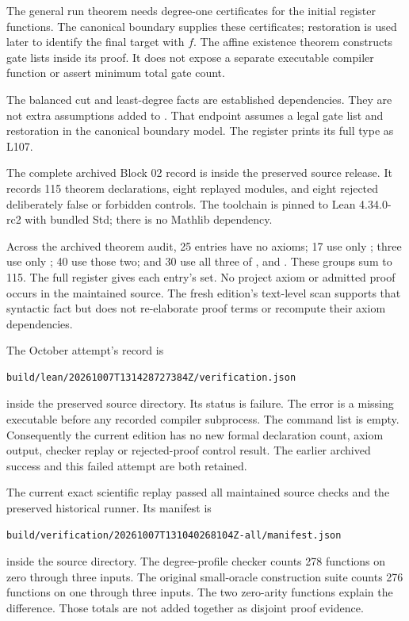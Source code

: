 The general run theorem needs degree-one certificates for the initial
register functions. The canonical boundary supplies these certificates;
restoration is used later to identify the final target with $f$. The affine
existence theorem constructs gate lists inside its proof. It does not expose
a separate executable compiler function or assert minimum total gate count.

The balanced cut and least-degree facts are established dependencies. They
are not extra assumptions added to .
That endpoint assumes a legal gate list and restoration in the canonical
boundary model. The register prints its full type as L107.

The complete archived Block 02 record is
inside the preserved source release. It records 115 theorem declarations,
eight replayed modules, and eight rejected deliberately false or forbidden
controls. The toolchain is pinned to Lean 4.34.0-rc2 with bundled Std; there
is no Mathlib dependency.

Across the archived theorem audit, 25 entries have no axioms; 17 use only
; three use only ; 40 use those two; and 30 use
all three of ,  and .
These groups sum to 115. The full register gives each entry's set. No project
axiom or admitted proof occurs in the maintained source. The fresh edition's
text-level scan supports that syntactic fact but does not re-elaborate proof
terms or recompute their axiom dependencies.

The October attempt's record is
\begin{lstlisting}
build/lean/20261007T131428727384Z/verification.json
\end{lstlisting}
inside the preserved source directory. Its status is failure. The error is
a missing  executable before any recorded compiler subprocess.
The command list is empty. Consequently the current edition has no new
formal declaration count, axiom output, checker replay or rejected-proof
control result. The earlier archived success and this failed attempt are
both retained.

The current exact scientific replay passed all maintained source checks and
the preserved historical runner. Its manifest is
\begin{lstlisting}
build/verification/20261007T131040268104Z-all/manifest.json
\end{lstlisting}
inside the source directory. The degree-profile checker counts 278 functions
on zero through three inputs. The original small-oracle construction suite
counts 276 functions on one through three inputs. The two zero-arity functions
explain the difference. Those totals are not added together as disjoint proof
evidence.

